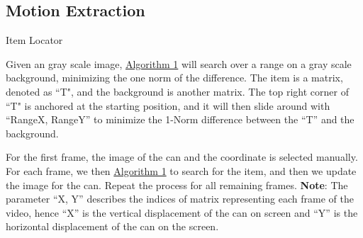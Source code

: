 \documentclass{article}
\begin{document}
    \subsection{Motion Extraction}

        \begin{algorithm}\label{alg:algorithm1}\small
            \begin{algorithmic}[1]
            {
                {
                    {
                    }
                    \ENDIF
                    {
                    }
                    \ENDIF
                }
                \ENDFOR
            }
            \ENDFOR
            \end{algorithmic}
        \caption{Item Locator}
        \end{algorithm}
        
        \par
        Given an gray scale image, \hyperref[alg:algorithm1]{Algorithm 1} will search over a range on a gray scale background, minimizing the one norm of the difference. The item is a matrix, denoted as ``T", and the background is another matrix. The top right corner of ``T" is anchored at the starting position, and it will then slide around with ``RangeX, RangeY'' to minimize the 1-Norm difference between the ``T'' and the background. 
        \par
        For the first frame, the image of the can and the coordinate is selected manually. For each frame, we then \hyperref[alg:algorithm1]{Algorithm 1} to search for the item, and then we update the image for the can. Repeat the process for all remaining frames. 
        \textbf{Note}: The parameter ``X, Y'' describes the indices of matrix representing each frame of the video, hence ``X'' is the vertical displacement of the can on screen and ``Y'' is the horizontal displacement of the can on the screen. 
\end{document}
